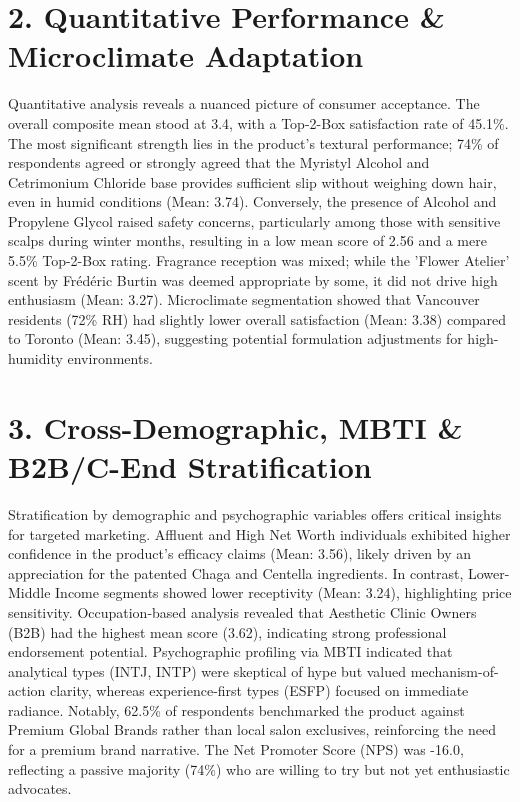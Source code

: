 \documentclass[10pt,twocolumn,a4paper]{article}
\begin{document}
\section{2. Quantitative Performance \& Microclimate Adaptation}
Quantitative analysis reveals a nuanced picture of consumer acceptance. The overall composite mean stood at 3.4, with a Top-2-Box satisfaction rate of 45.1\%. The most significant strength lies in the product's textural performance; 74\% of respondents agreed or strongly agreed that the Myristyl Alcohol and Cetrimonium Chloride base provides sufficient slip without weighing down hair, even in humid conditions (Mean: 3.74). Conversely, the presence of Alcohol and Propylene Glycol raised safety concerns, particularly among those with sensitive scalps during winter months, resulting in a low mean score of 2.56 and a mere 5.5\% Top-2-Box rating. Fragrance reception was mixed; while the 'Flower Atelier' scent by Frédéric Burtin was deemed appropriate by some, it did not drive high enthusiasm (Mean: 3.27). Microclimate segmentation showed that Vancouver residents (72\% RH) had slightly lower overall satisfaction (Mean: 3.38) compared to Toronto (Mean: 3.45), suggesting potential formulation adjustments for high-humidity environments.
\section{3. Cross-Demographic, MBTI \& B2B/C-End Stratification}
Stratification by demographic and psychographic variables offers critical insights for targeted marketing. Affluent and High Net Worth individuals exhibited higher confidence in the product's efficacy claims (Mean: 3.56), likely driven by an appreciation for the patented Chaga and Centella ingredients. In contrast, Lower-Middle Income segments showed lower receptivity (Mean: 3.24), highlighting price sensitivity. Occupation-based analysis revealed that Aesthetic Clinic Owners (B2B) had the highest mean score (3.62), indicating strong professional endorsement potential. Psychographic profiling via MBTI indicated that analytical types (INTJ, INTP) were skeptical of hype but valued mechanism-of-action clarity, whereas experience-first types (ESFP) focused on immediate radiance. Notably, 62.5\% of respondents benchmarked the product against Premium Global Brands rather than local salon exclusives, reinforcing the need for a premium brand narrative. The Net Promoter Score (NPS) was -16.0, reflecting a passive majority (74\%) who are willing to try but not yet enthusiastic advocates.
\end{document}
